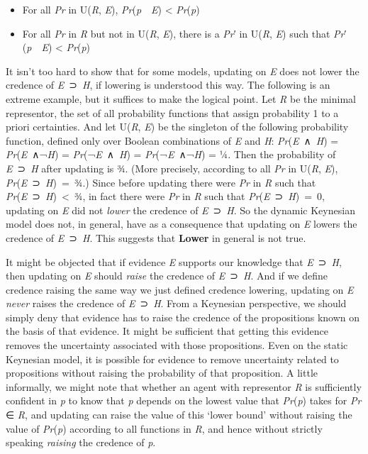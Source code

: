 \documentclass[
  10pt,
  letterpaper,
  DIV=11,
  numbers=noendperiod,
  twoside]{scrartcl}
\providecommand{\tightlist}{%
  \setlength{\itemsep}{0pt}\setlength{\parskip}{0pt}}\usepackage{longtable,booktabs,array}
\begin{document}
\begin{itemize}
\tightlist
\item
  For all \emph{Pr} in U(\emph{R}, \emph{E}),
  \emph{Pr}(\emph{p}~\textbar~\emph{E}) \textless{} \emph{Pr}(\emph{p})
\item
  For all \emph{Pr} in \emph{R} but not in U(\emph{R}, \emph{E}), there
  is a \emph{Pr}′ in U(\emph{R}, \emph{E}) such that
  \emph{Pr}′(\emph{p}~\textbar~\emph{E}) \textless{} \emph{Pr}(\emph{p})
\end{itemize}

It isn't too hard to show that for some models, updating on \emph{E}
does not lower the credence of \emph{E}~⊃~\emph{H}, if lowering is
understood this way. The following is an extreme example, but it
suffices to make the logical point. Let \emph{R} be the minimal
representor, the set of all probability functions that assign
probability 1 to a priori certainties. And let U(\emph{R}, \emph{E}) be
the singleton of the following probability function, defined only over
Boolean combinations of \emph{E} and \emph{H}:
\emph{Pr}(\emph{E}~∧~\emph{H}) = \emph{Pr}(\emph{E}~∧¬\emph{H}) =
\emph{Pr}(¬\emph{E}~∧~\emph{H}) = \emph{Pr}(¬\emph{E}~∧¬\emph{H}) = ¼.
Then the probability of \emph{E}~⊃~\emph{H} after updating is ¾. (More
precisely, according to all \emph{Pr} in U(\emph{R}, \emph{E}),
\emph{Pr}(\emph{E}~⊃~\emph{H})~=~¾.) Since before updating there were
\emph{Pr} in \emph{R} such that
\emph{Pr}(\emph{E}~⊃~\emph{H})~\textless~¾, in fact there were \emph{Pr}
in \emph{R} such that \emph{Pr}(\emph{E}~⊃~\emph{H})~=~0, updating on
\emph{E} did not \emph{lower} the credence of \emph{E}~⊃~\emph{H}. So
the dynamic Keynesian model does not, in general, have as a consequence
that updating on \emph{E} lowers the credence of \emph{E}~⊃~\emph{H}.
This suggests that \textbf{Lower} in general is not true.

It might be objected that if evidence \emph{E} supports our knowledge
that \emph{E}~⊃~\emph{H}, then updating on \emph{E} should \emph{raise}
the credence of \emph{E}~⊃~\emph{H}. And if we define credence raising
the same way we just defined credence lowering, updating on \emph{E}
\emph{never} raises the credence of \emph{E}~⊃~\emph{H}. From a
Keynesian perspective, we should simply deny that evidence has to raise
the credence of the propositions known on the basis of that evidence. It
might be sufficient that getting this evidence removes the uncertainty
associated with those propositions. Even on the static Keynesian model,
it is possible for evidence to remove uncertainty related to
propositions without raising the probability of that proposition. A
little informally, we might note that whether an agent with representor
\emph{R} is sufficiently confident in \emph{p} to know that \emph{p}
depends on the lowest value that \emph{Pr}(\emph{p}) takes for \emph{Pr}
∈ \emph{R}, and updating can raise the value of this `lower bound'
without raising the value of \emph{Pr}(\emph{p}) according to all
functions in \emph{R}, and hence without strictly speaking
\emph{raising} the credence of \emph{p}.
\end{document}
